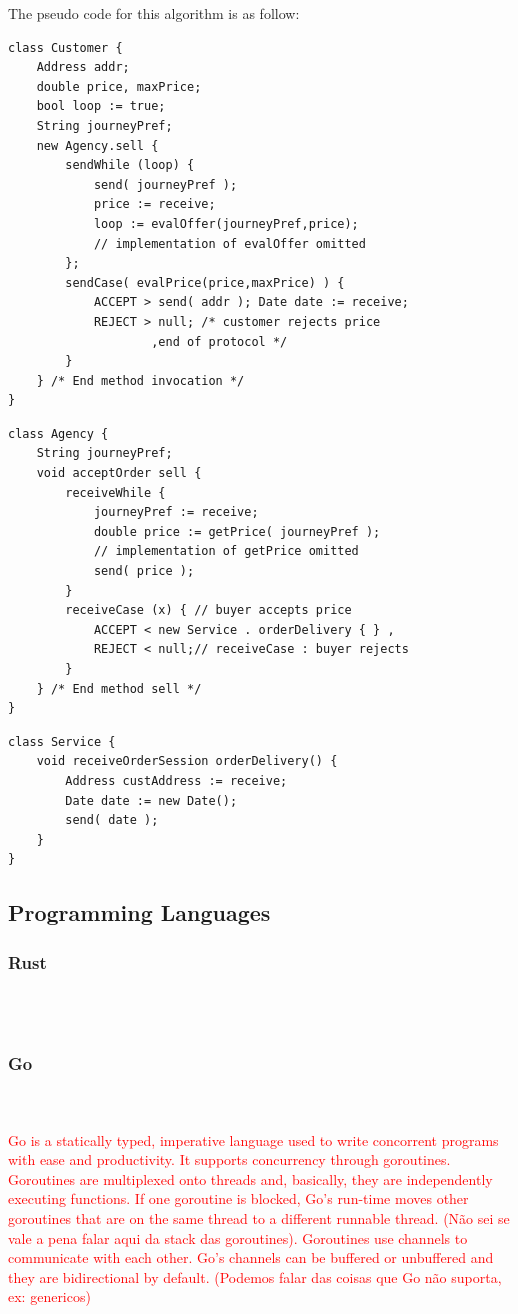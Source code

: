 \documentclass[runningheads]{llncs}
\begin{document}
The pseudo code for this algorithm is as follow:
\begin{lstlisting}[caption={Customer Algorithm},captionpos=b]
class Customer {
	Address addr;
	double price, maxPrice;
	bool loop := true;
	String journeyPref;
	new Agency.sell {
		sendWhile (loop) {
			send( journeyPref );
			price := receive;
			loop := evalOffer(journeyPref,price);
			// implementation of evalOffer omitted
		};
		sendCase( evalPrice(price,maxPrice) ) {
			ACCEPT > send( addr ); Date date := receive;
			REJECT > null; /* customer rejects price
					,end of protocol */ 
		}
	} /* End method invocation */
}
\end{lstlisting}
\begin{lstlisting}[caption={Agency Algorithm},captionpos=b]
class Agency {
	String journeyPref;
	void acceptOrder sell {
		receiveWhile {
			journeyPref := receive;
			double price := getPrice( journeyPref );
			// implementation of getPrice omitted
			send( price );
		}
		receiveCase (x) { // buyer accepts price
			ACCEPT < new Service . orderDelivery { } ,
			REJECT < null;// receiveCase : buyer rejects 
        }
	} /* End method sell */
}
\end{lstlisting}
\begin{lstlisting}[caption={Service Algorithm},captionpos=b]
class Service {
	void receiveOrderSession orderDelivery() {
		Address custAddress := receive;
		Date date := new Date();
		send( date );
	}
}
\end{lstlisting}
\subsection{Programming Languages}
\subsubsection{Rust}\hfill\\\\
\subsubsection{Go}\hfill\\\\
\textcolor{red}{Go is a statically typed, imperative language	used to write concorrent programs with ease and productivity. It supports concurrency through goroutines. Goroutines are multiplexed onto threads and, basically, they are independently executing functions. If one goroutine is blocked, Go's run-time moves other goroutines that are on the same thread to a different runnable thread. (Não sei se vale a pena falar aqui da stack das goroutines). Goroutines use channels to communicate with each other. Go's channels can be buffered or unbuffered and they are bidirectional by default. (Podemos falar das coisas que Go não suporta, ex: genericos)}
\end{document}

